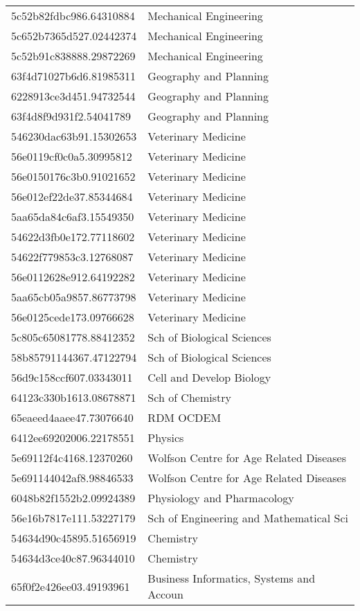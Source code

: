 \begin{tabular}{ll}
5c52b82fdbc986.64310884 & Mechanical Engineering \\
5c652b7365d527.02442374 & Mechanical Engineering \\
5c52b91c838888.29872269 & Mechanical Engineering \\
63f4d71027b6d6.81985311 & Geography and Planning \\
6228913ce3d451.94732544 & Geography and Planning \\
63f4d8f9d931f2.54041789 & Geography and Planning \\
546230dac63b91.15302653 & Veterinary Medicine \\
56e0119cf0c0a5.30995812 & Veterinary Medicine \\
56e0150176c3b0.91021652 & Veterinary Medicine \\
56e012ef22de37.85344684 & Veterinary Medicine \\
5aa65da84c6af3.15549350 & Veterinary Medicine \\
54622d3fb0e172.77118602 & Veterinary Medicine \\
54622f779853c3.12768087 & Veterinary Medicine \\
56e0112628e912.64192282 & Veterinary Medicine \\
5aa65cb05a9857.86773798 & Veterinary Medicine \\
56e0125cede173.09766628 & Veterinary Medicine \\
5c805c65081778.88412352 & Sch of Biological Sciences \\
58b85791144367.47122794 & Sch of Biological Sciences \\
56d9c158ccf607.03343011 & Cell and Develop Biology \\
64123c330b1613.08678871 & Sch of Chemistry \\
65eaeed4aaee47.73076640 & RDM OCDEM \\
6412ee69202006.22178551 & Physics \\
5e69112f4c4168.12370260 & Wolfson Centre for Age Related Diseases \\
5e691144042af8.98846533 & Wolfson Centre for Age Related Diseases \\
6048b82f1552b2.09924389 & Physiology and Pharmacology \\
56e16b7817e111.53227179 & Sch of Engineering and Mathematical Sci \\
54634d90c45895.51656919 & Chemistry \\
54634d3ce40c87.96344010 & Chemistry \\
65f0f2e426ee03.49193961 & Business Informatics, Systems and Accoun \\

\end{tabular}
